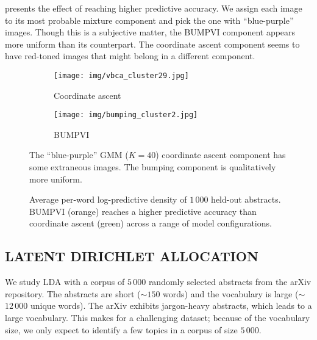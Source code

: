  presents the effect of reaching higher predictive accuracy.
We assign each image to its most probable mixture
component and pick the one with ``blue-purple'' images.
Though this is a subjective matter, the \gls{BUMPVI} component
appears more uniform than its counterpart.
The coordinate ascent component seems to have red-toned
images that might belong in a different component.

\begin{figure}[tb]
\centering
\begin{subfigure}[b]{0.23\textwidth} %
  \texttt{[image: img/vbca\_cluster29.jpg]}
  \caption{Coordinate ascent}
  \label{subfig:vbca}
\end{subfigure}%
\quad
\begin{subfigure}[b]{0.23\textwidth}
  \texttt{[image: img/bumping\_cluster2.jpg]}
  \caption{\gls{BUMPVI}}
  \label{subfig:bumping}
\end{subfigure}
\caption{The ``blue-purple'' \gls{GMM} ($K=40$)  coordinate ascent component
has some extraneous images. The bumping component is
qualitatively more uniform.}
\label{fig:clusters}
\end{figure}


\begin{figure}[tb]
\centering

\vspace*{-12pt}
\caption{Average per-word log-predictive density of $1\,000$ held-out
abstracts.
\gls{BUMPVI} (\textcolor{cb_orange}{orange}) reaches a higher predictive
accuracy than coordinate ascent (\textcolor{cb_green}{green}) across a
range of model configurations.}
\label{fig:lda_sweep}
\end{figure}


\subsection{LATENT DIRICHLET ALLOCATION}

We study \gls{LDA} with a corpus of $5\,000$
randomly selected abstracts from the arXiv repository. The abstracts are short
($\sim$$150$ words) and the vocabulary is large ($\sim$$12\,000$ unique words).
The arXiv exhibits jargon-heavy abstracts, which leads to a large
vocabulary. This makes for a challenging dataset; because of the vocabulary
size, we only expect to identify a few topics in a corpus of size $5\,000$.

